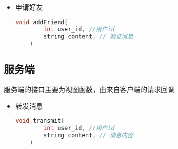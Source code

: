 {\begin{itemize}
    \item 申请好友
    \begin{lstlisting}[language=c++]
    void addFriend(
        int user_id, //用户id
        string content, // 验证消息
    )
    \end{lstlisting}
\end{itemize}

\subsection{服务端}
服务端的接口主要为视图函数，由来自客户端的请求回调
\begin{itemize}
    \item 转发消息
    \begin{lstlisting}[language=c++]
    void transmit(
        int user_id, //用户id
        string content, // 消息内容
    )
    \end{lstlisting}

\end{itemize}
}